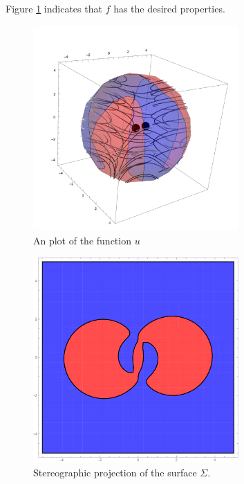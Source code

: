 \begin{example}
  Figure \ref{pl:n3_hf_inflowOutflowStagnationPoint_overview}
  indicates that $f$ has the desired properties.
  \begin{figure}
    \centering
    \includegraphics[width=0.7\textwidth]{../plots/n3_hf_inflowOutflow_Ball_overview.pdf}
    \caption{An plot of the function $u$}
    \label{pl:n3_hf_inflowOutflowStagnationPoint_overview}
  \end{figure}
  \begin{figure}
    \centering
    \includegraphics[width=0.7\textwidth]{../plots/n3_hf_inflowOutflow_Ball_Surface.pdf}
    \caption{Stereographic projection of the surface $\Sigma$.}
    \label{pl:n3_hf_inflowOutflowStagnationPoint_Surface}
  \end{figure}
\end{example}

